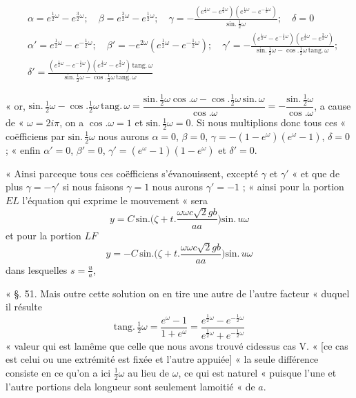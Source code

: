 \documentclass[11pt,a4paper]{article}
\begin{document}
\begin{align*}
&\alpha=e^{\frac{1}{2}\omega}-e^{\frac{3}{2}\omega};\quad \beta=e^{\frac{3}{2}\omega}-e^{\frac{1}{2}\omega};\quad \gamma=-\frac{(e^{\frac{1}{2}\omega}-e^{\frac{3}{2}\omega})(e^{\frac{1}{2}\omega}-e^{-\frac{1}{2}\omega})}{\text{sin.}\,\frac{1}{2}\omega};\quad \delta=0 \\
&\alpha'=e^{\frac{1}{2}\omega}-e^{-\frac{1}{2}\omega};\quad \beta'=-e^{2\omega}(e^{\frac{1}{2}\omega}-e^{-\frac{1}{2}\omega});\quad \gamma'=-\frac{(e^{\frac{1}{2}\omega}-e^{-\frac{1}{2}\omega})(e^{\frac{1}{2}\omega}-e^{\frac{3}{2}\omega})}{\text{sin.}\,\frac{1}{2}\omega-\cos.\frac{1}{2}\omega\,\text{tang.}\,\omega}; \\
&\delta'=\frac{(e^{\frac{1}{2}\omega}-e^{-\frac{1}{2}\omega})(e^{\frac{1}{2}\omega}-e^{\frac{3}{2}\omega})\,\text{tang.}\,\omega}{\text{sin.}\,\frac{1}{2}\omega-\cos.\frac{1}{2}\omega\,\text{tang.}\,\omega}
\end{align*}

« or,
$\text{sin.}\,\frac{1}{2}\omega-\cos.\frac{1}{2}\omega\,\text{tang.}\,\omega=\dfrac{\text{sin.}\,\frac{1}{2}\omega\cos.\omega-\cos.\frac{1}{2}\omega\,\text{sin.}\,\omega}{\cos.\omega}=-\dfrac{\text{sin.}\,\frac{1}{2}\omega}{\cos.\omega}$,
a cause de « $\omega=2i\pi$, on a $\cos.\omega=1$ et
$\text{sin.}\,\frac{1}{2}\omega=0$. Si nous multiplions donc tous ces «
coëfficiens par $\text{sin.}\,\frac{1}{2}\omega$ nous aurons $\alpha=0$,
$\beta=0$, $\gamma=-(1-e^{\omega})(e^{\omega}-1)$, $\delta=0$ ; « enfin
$\alpha'=0$, $\beta'=0$, $\gamma'=(e^{\omega}-1)(1-e^{\omega})$ et
$\delta'=0$.

« Ainsi parceque tous ces coëfficiens s'évanouissent, excepté $\gamma$ et
$\gamma'$ « et que de plus $\gamma=-\gamma'$ si nous faisons $\gamma=1$ nous
aurons $\gamma'=-1$ ; « ainsi pour la portion $E L$ l'équation qui exprime le
mouvement « sera
\[ y=C\,\text{sin.}\Big(\zeta+t.\frac{\omega\omega c\surd 2gb}{aa}\Big)\text{sin.}\,u\omega \]
et pour la portion $L F$
\[ y=-C\,\text{sin.}\Big(\zeta+t.\frac{\omega\omega c\surd 2gb}{aa}\Big)\text{sin.}\,u\omega \]
dans lesquelles $s=\frac{u}{a}$,

« §. 51. Mais outre cette solution on en tire une autre de l'autre facteur «
duquel il résulte
\[ \text{tang.}\,\tfrac{1}{2}\omega=\frac{e^{\omega}-1}{1+e^{\omega}}=\frac{e^{\frac{1}{2}\omega}-e^{-\frac{1}{2}\omega}}{e^{\frac{1}{2}\omega}+e^{-\frac{1}{2}\omega}} \]
« valeur qui est lamême que celle que nous avons trouvé cidessus cas V. «
[ce cas est celui ou une extrémité est fixée et l'autre appuiée] « la seule
différence consiste en ce qu'on a ici $\frac{1}{2}\omega$ au lieu de
$\omega$, ce qui est naturel « puisque l'une et l'autre portions dela
longueur sont seulement lamoitié « de $a$.
\end{document}
